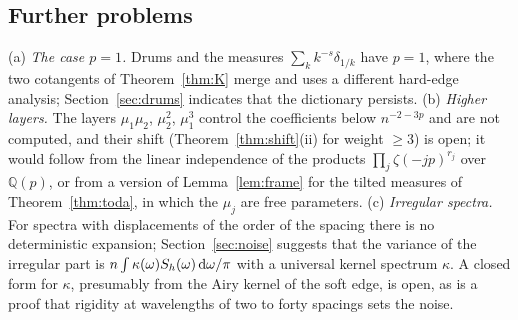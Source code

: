\subsection{Further problems}\label{sec:conj-further}
(a) \emph{The case $p=1$.} Drums and the measures $\sum_kk^{-s}\delta_{1/k}$ have $p=1$, where the two cotangents of
Theorem~\ref{thm:K} merge and \cite{PaperII} uses a different hard-edge analysis; Section~\ref{sec:drums} indicates that the
dictionary persists. (b) \emph{Higher layers.} The layers $\mu_1\mu_2$, $\mu_2^2$, $\mu_1^3$ control the coefficients below
$n^{-2-3p}$ and are not computed, and their shift (Theorem~\ref{thm:shift}(ii) for weight $\ge3$) is open; it would follow from the
linear independence of the products $\prod_j\zeta(-jp)^{r_j}$ over $\mathbb Q(p)$, or from a version of Lemma~\ref{lem:frame} for the
tilted measures of Theorem~\ref{thm:toda}, in which the $\mu_j$ are free parameters. (c) \emph{Irregular spectra.} For spectra with displacements of the order of the spacing
there is no deterministic expansion; Section~\ref{sec:noise} suggests that the variance of the irregular part is
$n\int\kappa(\omega)S_h(\omega)\,\mathrm{d}\omega/\pi$ with a universal kernel spectrum $\kappa$. A closed form for $\kappa$, presumably from
the Airy kernel of the soft edge, is open, as is a proof that rigidity at wavelengths of two to forty spacings sets the
noise.
